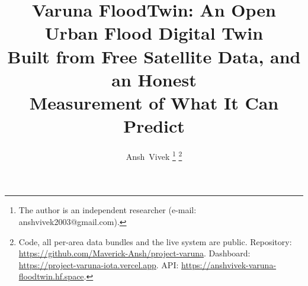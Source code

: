 \documentclass[journal]{IEEEtran}
\begin{document}
\title{Varuna FloodTwin: An Open Urban Flood Digital Twin\\ Built from Free Satellite Data, and an Honest\\ Measurement of What It Can Predict}

\author{Ansh~Vivek%
\thanks{The author is an independent researcher (e-mail: anshvivek2003@gmail.com).}%
\thanks{Code, all per-area data bundles and the live system are public. Repository:
\url{https://github.com/Maverick-Ansh/project-varuna}. Dashboard:
\url{https://project-varuna-iota.vercel.app}. API:
\url{https://anshvivek-varuna-floodtwin.hf.space}.}}


\maketitle
\end{document}
